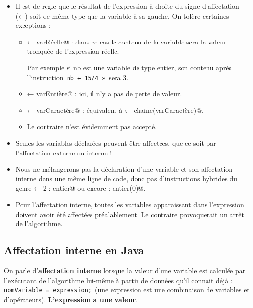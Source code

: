 \documentclass[11pt,a4paper]{article}
\begin{document}
					\begin{itemize}
				
			\item 
              Il est de r\`egle que le r\'esultat de l'expression \`a droite du signe d'affectation (←) soit de
              m\^eme type que la variable \`a sa gauche. On tol\`ere certaines exceptions :
              
					\begin{itemize}
				
			\item {} ← varRéelle@ : dans ce cas le contenu de la variable sera la valeur tronqu\'ee de l'expression r\'eelle. \par
				
                  Par exemple si \guillemotleft  nb \guillemotright  est une variable de type entier,
                  son contenu apr\`es l'instruction \,\verb|nb ← 15/4 »|\, sera 3.
                
			\item {} ← varEntière@ : ici, il n'y a pas de perte de valeur.
			\item \verb@varChaine ← varCaractère@ : \'equivalent \`a \verb@varChaine ← chaine(varCaractère)@.
			\item Le contraire n'est \'evidemment pas accept\'e.
					\end{itemize}
				
			\item 
            Seules les variables d\'eclar\'ees peuvent \^etre affect\'ees, que ce soit par l'affectation externe
            ou interne !
            
			\item 
            Nous ne m\'elangerons pas la d\'eclaration d'une variable et son affectation interne dans
            une m\^eme ligne de code, donc pas d'instructions hybrides du genre \verb@x ← 2 : entier@ ou
            encore \verb@x : entier(0)@.
            
			\item 
            Pour l'affectation interne, toutes les variables apparaissant dans l'expression doivent
            avoir \'et\'e affect\'ees pr\'ealablement. Le contraire provoquerait un arr\^et de l'algorithme.
            
					\end{itemize}
				
            \par
        \subsection{Affectation interne en Java}
          On parle d'\textbf{affectation interne} lorsque la valeur d'une variable est \guillemotleft  calcul\'ee \guillemotright  par l'ex\'ecutant
          de l'algorithme lui-m\^eme \`a partir de donn\'ees qu'il connait d\'ej\`a :
          \,\verb|nomVariable = expression;|\,
          (une expression est une combinaison de variables et d'op\'erateurs). \textbf{L'expression a une valeur}.
        
\end{document}
